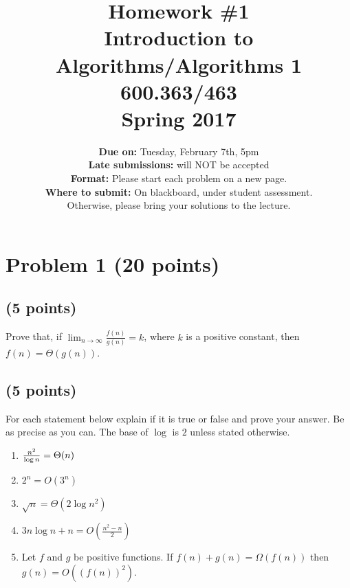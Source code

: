 \documentclass[letterpaper, 11pt]{article}
\begin{document}
\title{Homework \#1 \\ Introduction to Algorithms/Algorithms 1 \\ 600.363/463 \\ Spring 2017}
\author{\textbf{Due on:} Tuesday, February 7th, 5pm \\
\textbf{Late submissions:} will NOT be accepted\\
\textbf{Format:} Please start each problem on a new page.
\\\textbf{Where to submit:} On blackboard, under student assessment. \\
Otherwise, please bring your solutions to the lecture.
\\}


\maketitle



\section{Problem 1 (20 points)}

\subsection{(5 points)}

Prove that, if $\lim_{n \to \infty} \frac{f(n)}{g(n)} = k$, where $k$ is a positive constant, then $f(n) = \Theta(g(n))$.

\subsection{(5 points)}
For each statement below explain if it is true or false and prove
your answer. Be as precise as you can. The base of $\log$ is $2$ unless stated otherwise.

\begin{enumerate}

\item  ${n^2\over \log n} = \Theta(n)$

\item $2^n = O(3^{n})$

\item $\sqrt{n} = \Theta(2\log n^2)$

\item $3n\log n + n = O(\frac{n^2-n}{2})$

\item Let $f$ and $g$ be positive functions. If $f(n)+g(n) = \Omega(f(n))$ then $g(n) = O((f(n))^2)$.

\end{enumerate}
\end{document}

